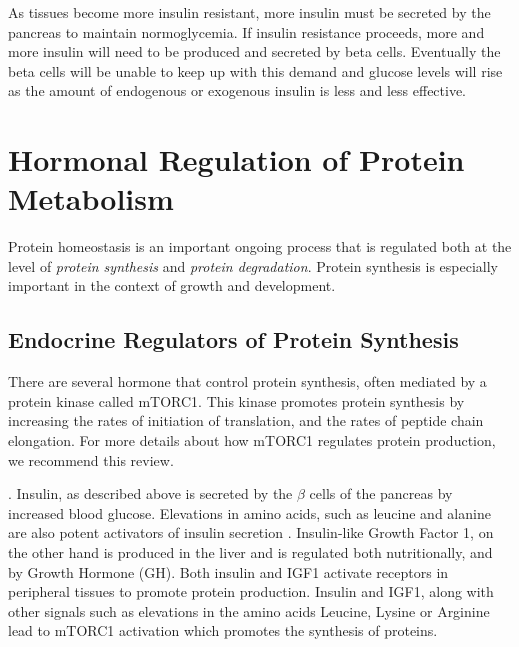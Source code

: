 \documentclass{tufte-handout}
\begin{document}
As tissues become more insulin resistant, more insulin must be secreted by the pancreas to maintain normoglycemia.  If insulin resistance proceeds, more and more insulin will need to be produced and secreted by beta cells.  Eventually the beta cells will be unable to keep up with this demand and glucose levels will rise as the amount of endogenous or exogenous insulin is less and less effective.

\section{Hormonal Regulation of Protein Metabolism}
Protein homeostasis is an important ongoing process that is regulated both at the level of \emph{protein synthesis} and \emph{protein degradation}.  Protein synthesis is especially important in the context of growth and development.  

\subsection{Endocrine Regulators of Protein Synthesis}

There are several hormone that control protein synthesis, often mediated by a protein kinase called mTORC1.   This kinase promotes protein synthesis by increasing the rates of initiation of translation, and the rates of peptide chain elongation.  For more details about how mTORC1 regulates protein production, we recommend this review\citep{Gingras2004}.

.  Insulin, as described above is secreted by the $\beta$ cells of the pancreas by increased blood glucose.  Elevations in amino acids, such as leucine and alanine are also potent activators of insulin secretion \citep{Floyd1966}.  Insulin-like Growth Factor 1, on the other hand is produced in the liver and is regulated both nutritionally, and by Growth Hormone (GH).  Both insulin and IGF1 activate receptors in peripheral tissues to promote protein production.   Insulin and IGF1, along with other signals such as elevations in the amino acids Leucine, Lysine or Arginine lead to mTORC1 activation which promotes the synthesis of proteins.
\end{document}
